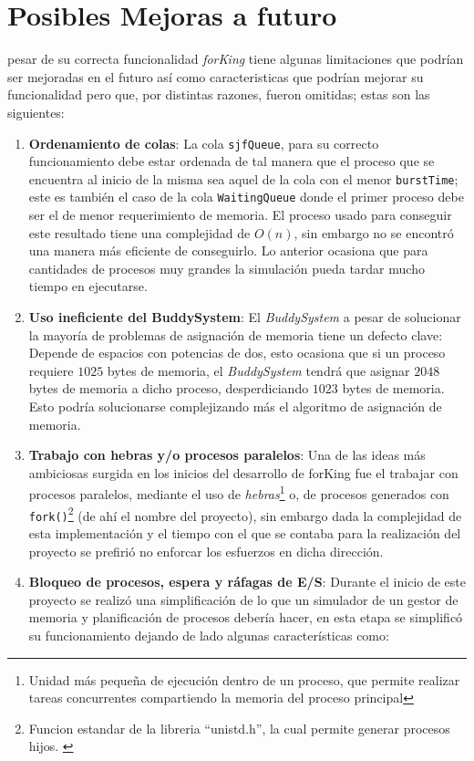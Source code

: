 \section{Posibles Mejoras a futuro}
 pesar de su correcta funcionalidad \textit{forKing} tiene algunas limitaciones que podrían ser mejoradas en el futuro así como caracteristicas que podrían mejorar su funcionalidad pero que, por distintas razones, fueron omitidas; estas son las siguientes:
\begin{enumerate}
    \item \textbf{Ordenamiento de colas}: La cola \texttt{sjfQueue}, para su correcto funcionamiento debe estar ordenada de tal manera que el proceso que se encuentra al inicio de la misma sea aquel de la cola con el menor \texttt{burstTime}; este es también el caso de la cola \texttt{WaitingQueue} donde el primer proceso debe ser el de menor requerimiento de memoria.
    El proceso usado para conseguir este resultado tiene una complejidad de $O(n)$, sin embargo no se encontró una manera más eficiente de conseguirlo.
    Lo anterior ocasiona que para cantidades de procesos muy grandes la simulación pueda tardar mucho tiempo en ejecutarse.
    \item \textbf{Uso ineficiente del BuddySystem}: El \textit{BuddySystem} a pesar de solucionar la mayoría de problemas de asignación de memoria tiene un defecto clave: Depende de espacios con potencias de dos, esto ocasiona que si un proceso requiere $1025$ bytes de memoria, el \textit{BuddySystem} tendrá que asignar $2048$ bytes de memoria a dicho proceso, desperdiciando $1023$ bytes de memoria.
    Esto podría solucionarse complejizando más el algoritmo de asignación de memoria.
    \item \textbf{Trabajo con hebras y/o procesos paralelos}: Una de las ideas más ambiciosas surgida en los inicios del desarrollo de forKing fue el trabajar con procesos paralelos, mediante el uso de \textit{hebras}\footnote{Unidad más pequeña de ejecución dentro de un proceso, que permite realizar tareas concurrentes compartiendo la memoria del proceso principal} o, de procesos generados con \texttt{fork()}\footnote{Funcion estandar de la libreria ``unistd.h'', la cual permite generar procesos hijos. \parencite{fork_function}} (de ahí el nombre del proyecto), sin embargo dada la complejidad de esta implementación y el tiempo con el que se contaba para la realización del proyecto se prefirió no enforcar los esfuerzos en dicha dirección.
    \item \textbf{Bloqueo de procesos, espera y ráfagas de E/S}: Durante el inicio de este proyecto se realizó una simplificación de lo que un simulador de un gestor de memoria y planificación de procesos debería hacer, en esta etapa se simplificó su funcionamiento dejando de lado algunas características como:

\end{enumerate}
